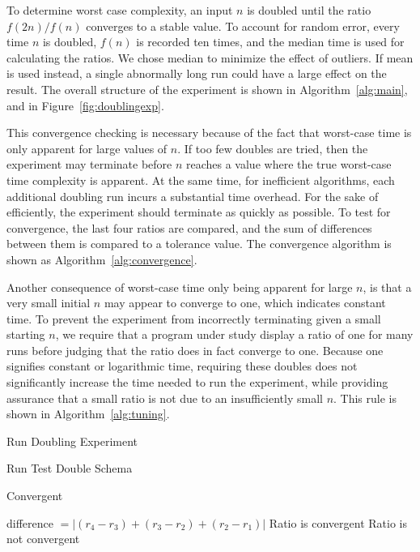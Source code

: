   To determine worst case complexity, an input $n$ is doubled until the 
  ratio $f(2n) / f(n)$ converges to a stable value. To account for random
  error, every time $n$ is doubled, $f(n)$ is recorded ten times, and the
  median time is used for calculating the ratios.  We chose
  median to minimize the effect of outliers. If mean is used instead, a
  single abnormally long run could have a large effect on the result. The overall 
  structure of the experiment is shown in Algorithm~\ref{alg:main}, and in
  Figure~\ref{fig:doublingexp}.

  This convergence checking is necessary because of the fact that worst-case
  time is only apparent for large values of $n$. If too few doubles
  are tried, then the experiment may terminate before $n$ reaches a value
  where the true worst-case time complexity is apparent. At the same time,
  for inefficient  algorithms, each additional doubling run incurs a substantial
  time overhead. For the sake of efficiently, the experiment should
  terminate as quickly as possible.
  To test for convergence, the last four ratios are compared, and the
  sum of differences between them is compared to a tolerance value. The
  convergence algorithm is shown as Algorithm~\ref{alg:convergence}.

  Another consequence of worst-case time only being apparent for large
  $n$, is that a very small initial $n$ may appear to converge to one,
  which indicates constant time. To prevent the
  experiment from incorrectly terminating given a small starting $n$, we
  require that a program under study display a ratio of one for many
  runs before judging that the ratio does in fact converge to one. Because 
  one signifies constant or logarithmic 
  time, requiring these doubles does not significantly increase the time needed
  to run the experiment, while providing assurance that a small ratio is not due
  to an insufficiently small $n$. This rule is shown in 
  Algorithm~\ref{alg:tuning}.

  \begin{algorithm}[t]
    \caption{Run Doubling Experiment}
    \begin{algorithmic}
      \STATE Run Test
      \ENDFOR
      \STATE Double Schema
      \ENDWHILE
    \end{algorithmic}
    \label{alg:main}
  \end{algorithm}

  \begin{algorithm}[t]
    \caption{Convergent}
    \begin{algorithmic}
      \STATE difference $= |(r_4 - r_3) + (r_3 -r_2) + (r_2 - r_1)|$
      \RETURN Ratio is convergent
      \ELSE
      \RETURN Ratio is not convergent
      \ENDIF
    \end{algorithmic}
    \label{alg:convergence}
  \end{algorithm}

